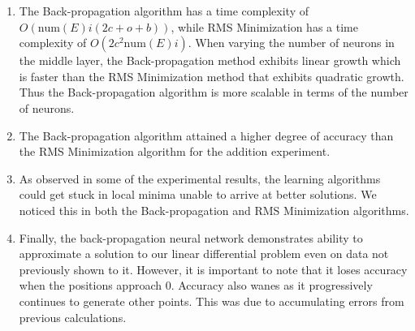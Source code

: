 \documentclass[11pt]{article}
\begin{document}
\begin{enumerate}

\item The Back-propagation algorithm has a time complexity of $O(\mbox{num}(E)i(2c+o+b))$, while RMS Minimization has a time complexity of $O(2c^2\mbox{num}(E)i)$. When varying the number of neurons in the middle layer, the Back-propagation method exhibits linear growth which is faster than the RMS Minimization method that exhibits quadratic growth. Thus the Back-propagation algorithm is more scalable in terms of the number of neurons.

\item The Back-propagation algorithm attained a higher degree of accuracy than the RMS Minimization algorithm for the addition
experiment.

\item As observed in some of the experimental results, the learning algorithms could get stuck in local minima unable to arrive at
better solutions. We noticed this in both the Back-propagation and RMS Minimization algorithms.

\item Finally, the back-propagation neural network demonstrates ability to approximate a solution to our linear differential problem
even on data not previously shown to it. However, it is important to note that it loses accuracy when the positions approach $0$.
Accuracy also wanes as it progressively continues to generate other points. This was due to accumulating errors from previous
calculations.

\end{enumerate}



\end{document}

